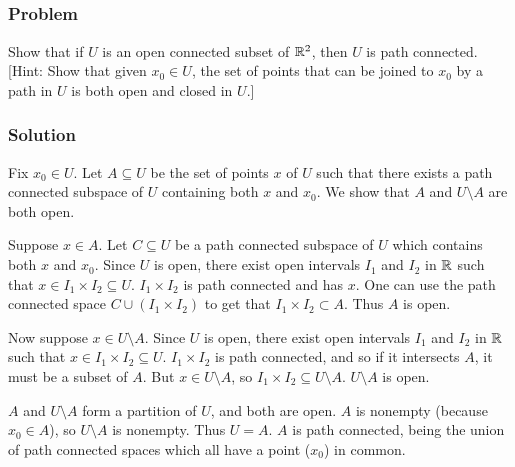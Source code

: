 
\setcounter{subsection}{9} %
\subsection{}

\subsubsection{Problem}
Show that if $U$ is an open connected subset of $\mathbb R^2$, then $U$ is path connected. [Hint: Show that given $x_0 \in U$, the set of points that can be joined to $x_0$ by a path in $U$ is both open and closed in $U$.]

\subsubsection{Solution}
Fix $x_0 \in U$. Let $A \subseteq U$ be the set of points $x$ of $U$ such that there exists a path connected subspace of $U$ containing both $x$ and $x_0$. We show that $A$ and $U \setminus A$ are both open.

Suppose $x \in A$. Let $C \subseteq U$ be a path connected subspace of $U$ which contains both $x$ and $x_0$. Since $U$ is open, there exist open intervals $I_1$ and $I_2$ in $\mathbb R$ such that $x \in I_1 \times I_2 \subseteq U$. $I_1 \times I_2$ is path connected and has $x$. One can use the path connected space $C \cup (I_1 \times I_2)$ to get that $I_1 \times I_2 \subset A$. Thus $A$ is open.

Now suppose $x \in U \setminus A$. Since $U$ is open, there exist open intervals $I_1$ and $I_2$ in $\mathbb R$ such that $x \in I_1 \times I_2 \subseteq U$. $I_1 \times I_2$ is path connected, and so if it intersects $A$, it must be a subset of $A$. But $x \in U \setminus A$, so $I_1 \times I_2 \subseteq U \setminus A$. $U \setminus A$ is open.

$A$ and $U \setminus A$ form a partition of $U$, and both are open. $A$ is nonempty (because $x_0 \in A$), so $U \setminus A$ is nonempty. Thus $U = A$. $A$ is path connected, being the union of path connected spaces which all have a point ($x_0$) in common.


\setcounter{subsection}{11} %
\subsection{}

